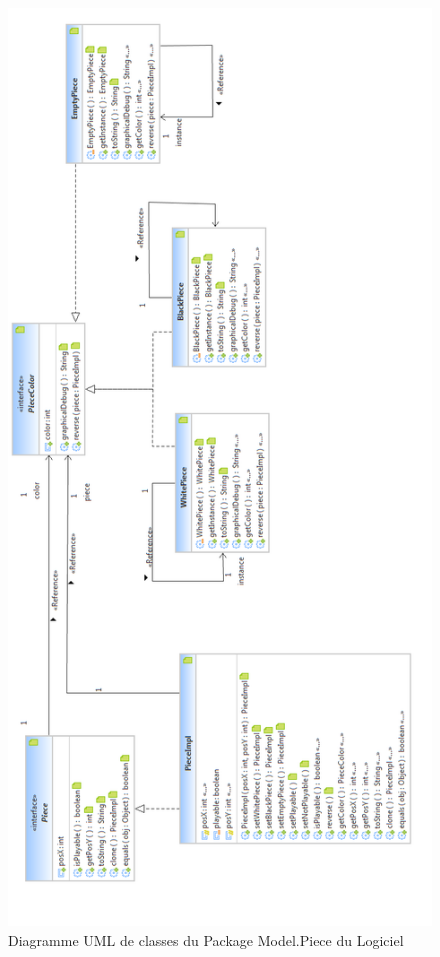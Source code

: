\documentclass[a4paper,12pt]{report}
\begin{document}
\label{OthKerModelPiece}
\begin{figure}[H]
\centering
 \includegraphics[scale=0.54]{Kernel/Pack_com_model_piece.png}
\caption{Diagramme UML de classes du Package Model.Piece du Logiciel}
\end{figure}
\end{document}

